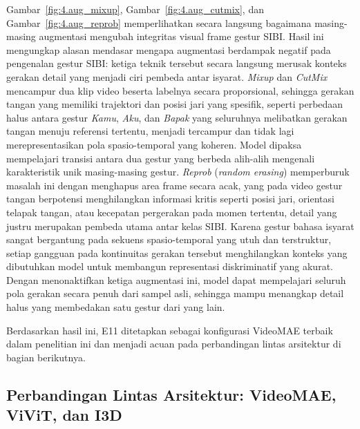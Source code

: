 Gambar~\ref{fig:4.aug_mixup}, Gambar~\ref{fig:4.aug_cutmix}, dan Gambar~\ref{fig:4.aug_reprob} memperlihatkan secara langsung bagaimana masing-masing augmentasi mengubah integritas visual frame gestur SIBI. Hasil ini mengungkap alasan mendasar mengapa augmentasi berdampak negatif pada pengenalan gestur SIBI: ketiga teknik tersebut secara langsung merusak konteks gerakan detail yang menjadi ciri pembeda antar isyarat. \textit{Mixup} dan \textit{CutMix} mencampur dua klip video beserta labelnya secara proporsional, sehingga gerakan tangan yang memiliki trajektori dan posisi jari yang spesifik, seperti perbedaan halus antara gestur \textit{Kamu}, \textit{Aku}, dan \textit{Bapak} yang seluruhnya melibatkan gerakan tangan menuju referensi tertentu, menjadi tercampur dan tidak lagi merepresentasikan pola spasio-temporal yang koheren. Model dipaksa mempelajari transisi antara dua gestur yang berbeda alih-alih mengenali karakteristik unik masing-masing gestur. \textit{Reprob} (\textit{random erasing}) memperburuk masalah ini dengan menghapus area frame secara acak, yang pada video gestur tangan berpotensi menghilangkan informasi kritis seperti posisi jari, orientasi telapak tangan, atau kecepatan pergerakan pada momen tertentu, detail yang justru merupakan pembeda utama antar kelas SIBI. Karena gestur bahasa isyarat sangat bergantung pada sekuens spasio-temporal yang utuh dan terstruktur, setiap gangguan pada kontinuitas gerakan tersebut menghilangkan konteks yang dibutuhkan model untuk membangun representasi diskriminatif yang akurat. Dengan menonaktifkan ketiga augmentasi ini, model dapat mempelajari seluruh pola gerakan secara penuh dari sampel asli, sehingga mampu menangkap detail halus yang membedakan satu gestur dari yang lain.\par

Berdasarkan hasil ini, E11 ditetapkan sebagai konfigurasi VideoMAE terbaik dalam penelitian ini dan menjadi acuan pada perbandingan lintas arsitektur di bagian berikutnya.\par

\subsection{Perbandingan Lintas Arsitektur: VideoMAE, ViViT, dan I3D} \label{IV.Sek6}

